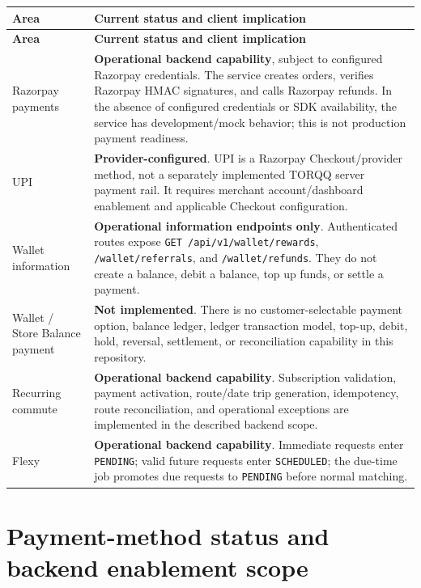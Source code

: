 \documentclass[11pt,a4paper]{article}
\newcommand{\status}[1]{\textbf{#1}}
\newcommand{\code}[1]{\texttt{#1}}
\begin{document}
\begin{longtable}{Y Z}
\toprule
\textbf{Area} & \textbf{Current status and client implication} \\
\midrule
\endfirsthead
\toprule
\textbf{Area} & \textbf{Current status and client implication} \\
\midrule
\endhead
Razorpay payments & \status{Operational backend capability}, subject to configured Razorpay credentials. The service creates orders, verifies Razorpay HMAC signatures, and calls Razorpay refunds. In the absence of configured credentials or SDK availability, the service has development/mock behavior; this is not production payment readiness. \\
UPI & \status{Provider-configured}. UPI is a Razorpay Checkout/provider method, not a separately implemented TORQQ server payment rail. It requires merchant account/dashboard enablement and applicable Checkout configuration. \\
Wallet information & \status{Operational information endpoints only}. Authenticated routes expose \code{GET /api/v1/wallet/rewards}, \code{/wallet/referrals}, and \code{/wallet/refunds}. They do not create a balance, debit a balance, top up funds, or settle a payment. \\
Wallet / Store Balance payment & \status{Not implemented}. There is no customer-selectable payment option, balance ledger, ledger transaction model, top-up, debit, hold, reversal, settlement, or reconciliation capability in this repository. \\
Recurring commute & \status{Operational backend capability}. Subscription validation, payment activation, route/date trip generation, idempotency, route reconciliation, and operational exceptions are implemented in the described backend scope. \\
Flexy & \status{Operational backend capability}. Immediate requests enter \code{PENDING}; valid future requests enter \code{SCHEDULED}; the due-time job promotes due requests to \code{PENDING} before normal matching. \\
\bottomrule
\end{longtable}

\section{Payment-method status and backend enablement scope}
\end{document}
